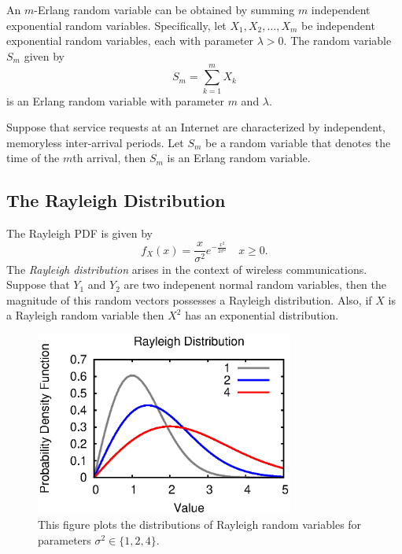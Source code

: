 An $m$-Erlang random variable can be obtained by summing $m$ independent exponential random variables.
Specifically, let $X_1, X_2, \ldots, X_m$ be independent exponential random variables, each with parameter $\lambda > 0$.
The random variable $S_m$ given by
\begin{equation*}
S_m = \sum_{k=1}^m X_k
\end{equation*}
is an Erlang random variable with parameter $m$ and $\lambda$.

\begin{example}
Suppose that service requests at an Internet are characterized by independent, memoryless inter-arrival periods.
Let $S_m$ be a random variable that denotes the time of the $m$th arrival, then $S_m$ is an Erlang  random variable.
\end{example}


\subsection{The Rayleigh Distribution}

The Rayleigh PDF is given by 
\begin{equation*}
f_X (x) = \frac{x}{\sigma^2} e^{- \frac{x^2}{2 \sigma^2} } \quad x \geq 0 .
\end{equation*}
The \emph{Rayleigh distribution} arises in the context of wireless communications.
Suppose that $Y_1$ and $Y_2$ are two indepenent normal random variables, then the  magnitude of this random vectors possesses a Rayleigh distribution.
Also, if $X$ is a Rayleigh random variable then $X^2$ has an exponential distribution.

\begin{figure}[ht]
\begin{center}
\includegraphics[width=8.5cm]{Figures/8chapter/rayleigh_pdf}
\end{center}
\caption{This figure plots the distributions of Rayleigh random variables for parameters $\sigma^2 \in \{ 1, 2, 4 \}$.}
\end{figure}


